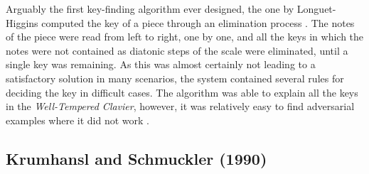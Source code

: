Arguably the first key-finding algorithm ever designed, the one by Longuet-Higgins computed the key of a piece through an elimination process \cite{longuethiggins1971interpreting}. The notes of the piece were read from left to right, one by one, and all the keys in which the notes were not contained as diatonic steps of the scale were eliminated, until a single key was remaining. As this was almost certainly not leading to a satisfactory solution in many scenarios, the system contained several rules for deciding the key in difficult cases. The algorithm was able to explain all the keys in the \emph{Well-Tempered Clavier}, however, it was relatively easy to find adversarial examples where it did not work \cite{temperley2008pitchclass}.

\subsection{Krumhansl and Schmuckler (1990)}

